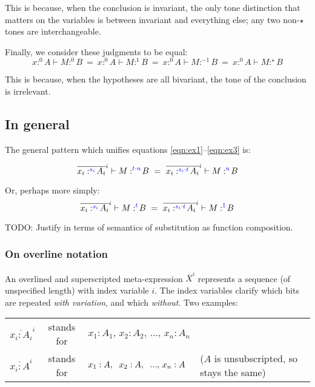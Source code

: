 \documentclass{article}
\newcommand{\todo}[1]{{\color{red}#1}}
\newcommand{\tm}{\ensuremath{1}}     %
\newcommand{\ta}{\ensuremath{-1}}    %
\newcommand{\ti}{\ensuremath{\star}} %
\newcommand{\tb}{\ensuremath{0}}     %
\newcommand{\tc}{\cdot}         %
\newcommand{\h}[3]{#1 :^{#3}\! {#2}}
\newcommand{\hm}[2]{\h{#1}{#2}{\tm}}
\newcommand{\ha}[2]{\h{#1}{#2}{\ta}}
\newcommand{\hi}[2]{\h{#1}{#2}{\ti}}
\newcommand{\hb}[2]{\h{#1}{#2}{\tb}}
\begin{document}
This is because, when the conclusion is invariant, the only tone distinction
that matters on the variables is between invariant and everything else; any two
non-$\ti$ tones are interchangeable.

Finally, we consider these judgments to be equal:
\begin{equation} \label{eqn:ex3}
  \hb{x}{A} \vdash \hb{M}{B}
  ~=~
  \hb{x}{A} \vdash \hm{M}{B}
  ~=~
  \hb{x}{A} \vdash \ha{M}{B}
  ~=~
  \hb{x}{A} \vdash \hi{M}{B}
\end{equation}

This is because, when the hypotheses are all bivariant, the tone of the
conclusion is irrelevant.


\subsection{In general}
The general pattern which unifies equations \ref{eqn:ex1}--\ref{eqn:ex3} is:

\newcommand{\hilited}{\color{blue}}

\begin{equation}
  \overline{\h{x_i}{A_i}{\hilited s_i}}^i \vdash \h{M}{B}{\hilited t \tc u}
  ~=~
  \overline{\h{x_i}{A_i}{\hilited s_i \tc t}}^i
  \vdash \h{M}{B}{\hilited u}
\end{equation}

Or, perhaps more simply:
\begin{equation}
  \overline{\h{x_i}{A_i}{\hilited s_i}}^i \vdash \h{M}{B}{\hilited t}
  ~=~
  \overline{\h{x_i}{A_i}{\hilited s_i \tc t}}^i
  \vdash \h{M}{B}{\hilited\tm}
\end{equation}

\todo{TODO: Justify in terms of semantics of substitution as function
  composition.}

\subsubsection{On overline notation}

An overlined and superscripted meta-expression $\overline{X}^i$ represents a
sequence (of unspecified length) with index variable $i$. The index variables
clarify which bits are repeated \emph{with variation}, and which \emph{without}.
Two examples:

\begin{center}
  \begin{tabular}{lcll}
    $\overline{x_i : A_i}^i$ & stands for
    & $x_1 : A_1,\, x_2 : A_2,\, ...,\, x_n : A_n$
    \\
    $\overline{x_i : A}^i$ & stands for
    & $x_1 : A,\hspace{0.6em} x_2 : A,\hspace{0.6em} ...,\, x_n : A$
    & ($A$ is unsubscripted, so stays the same)
  \end{tabular}
\end{center}
\end{document}
